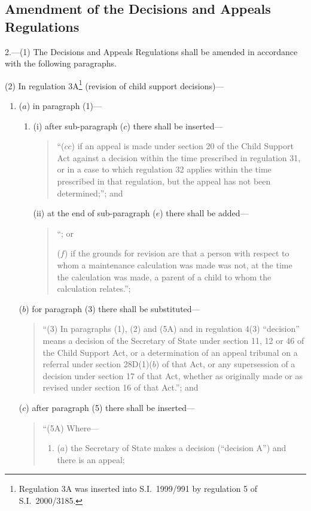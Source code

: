 \documentclass[12pt,a4paper]{article}
\begin{document}
\subsection[2. Amendment of the Decisions and Appeals Regulations]{Amendment of the Decisions and Appeals Regulations}

2.---(1)  The Decisions and Appeals Regulations shall be amended in accordance with the following paragraphs.

(2) In regulation 3A\footnote{Regulation 3A was inserted into S.I.\ 1999/991 by regulation 5 of S.I.\ 2000/3185.} (revision of child support decisions)—
\begin{enumerate}\item[]
($a$) in paragraph (1)—
\begin{enumerate}\item[]
(i) after sub-paragraph ($c$)  there shall be inserted—
\begin{quotation}
“($cc$) if an appeal is made under section 20 of the Child Support Act against a decision within the time prescribed in regulation 31, or in a case to which regulation 32 applies within the time prescribed in that regulation, but the appeal has not been determined;”; and
\end{quotation}

(ii) at the end of sub-paragraph ($e$)  there shall be added—
\begin{quotation}
    “; or

    ($f$) 
    if the grounds for revision are that a person with respect to whom a maintenance calculation was made was not, at the time the calculation was made, a parent of a child to whom the calculation relates.”; 
\end{quotation}
\end{enumerate}

($b$) for paragraph (3) there shall be substituted—
\begin{quotation}
“(3) In paragraphs (1), (2) and (5A) and in regulation 4(3) “decision” means a decision of the Secretary of State under section 11, 12 or 46 of the Child Support Act, or a determination of an appeal tribunal on a referral under section 28D(1)($b$)  of that Act, or any supersession of a decision under section 17 of that Act, whether as originally made or as revised under section 16 of that Act.”; and
\end{quotation}

($c$) after paragraph (5) there shall be inserted—
\begin{quotation}
“(5A) Where—
\begin{enumerate}\item[]
($a$) the Secretary of State makes a decision (“decision A”) and there is an appeal;


\end{enumerate}
\end{quotation}
\end{enumerate}
\end{document}
